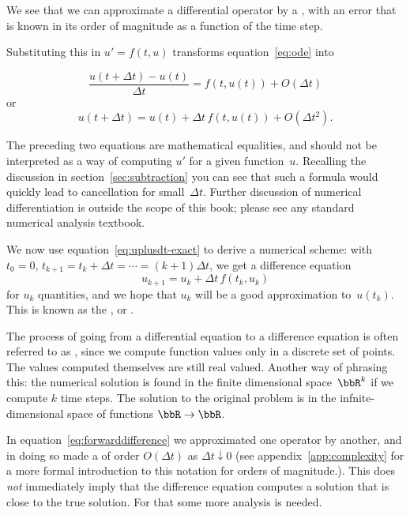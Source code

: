 We see that we can approximate a differential operator by a
, with an error that is known in its
order of magnitude as a function of the time step.

Substituting this in $u'=f(t,u)$ transforms equation~\ref{eq:ode} into

\begin{equation}
  \frac{u(t+\Delta t)-u(t)}{\Delta t} = f(t,u(t)) +O(\Delta t)
\end{equation}
or 
\begin{equation}
  u(t+\Delta t) = u(t) + \Delta t\,f(t,u(t)) +O(\Delta t^2).
  \label{eq:uplusdt-exact}
\end{equation}

\begin{remark}
  The preceding two equations are
  mathematical equalities, and should not be interpreted as a way
  of computing $u'$ for a given function~$u$. Recalling the discussion
  in section~\ref{sec:subtraction} you can see that such a formula would
  quickly lead to cancellation for small~$\Delta t$. Further discussion
  of numerical differentiation is outside the scope of this book;
  please see any standard numerical analysis textbook.
\end{remark}

We now use equation~\eqref{eq:uplusdt-exact} to derive a numerical scheme:
with $t_0=0$, $t_{k+1}=t_k+\Delta t=\cdots=(k+1)\Delta t$,
we get a difference equation
\begin{equation}
  u_{k+1}=u_k+\Delta t\,f(t_k,u_k)
\end{equation}
for $u_k$ quantities, and we hope that $u_k$ will be a good
approximation to~$u(t_k)$.
This is known as the ,
or .

The process of going from a differential equation to a difference
equation is often referred to as , since we
compute function values only in a discrete set of points. The values
computed themselves are still real valued. Another way of phrasing
this: the numerical solution is found in the finite dimensional
space~$\bbR^k$ if we compute $k$ time steps. The solution to the original
problem is in the infnite-dimensional space of functions $\bbR\rightarrow\bbR$.

In equation~\eqref{eq:forwarddifference} we approximated one operator by
another, and in doing so made a  of order
$O(\Delta t)$ as $\Delta t\downarrow 0$ (see
appendix~\ref{app:complexity} for a more formal introduction to this
notation for orders of magnitude.). This does \emph{not} immediately
imply that the difference equation computes a solution that is close
to the true solution. For that some more analysis is needed.

